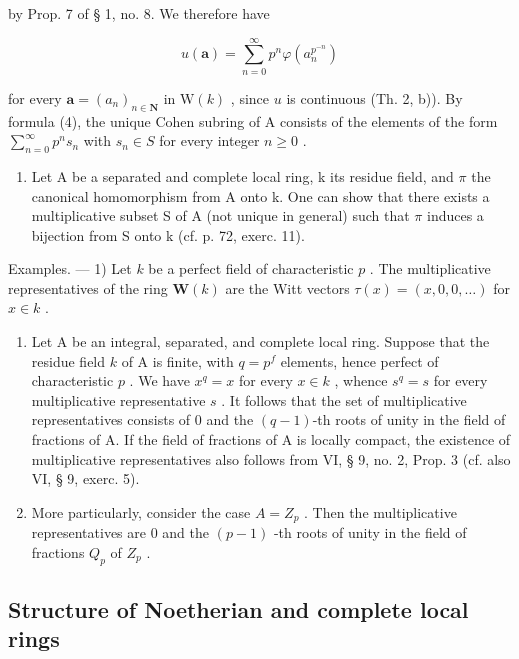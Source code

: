 by Prop. 7 of § 1, no. 8. We therefore have

\[
u (\boldsymbol {a}) = \sum_ {n = 0} ^ {\infty} p ^ {n} \varphi (a _ {n} ^ {p ^ {- n}})\tag{4}
\]

for every \(\boldsymbol{a} = (a_n)_{n \in \mathbf{N}}\) in \(\mathrm{W}(k)\) , since \(u\) is continuous (Th. 2, b)). By formula (4), the unique Cohen subring of A consists of the elements of the form \(\sum_{n=0}^{\infty} p^n s_n\) with \(s_n \in S\) for every integer \(n \geqslant 0\) .

\begin{enumerate}
\def\labelenumi{\arabic{enumi})}
\setcounter{enumi}{1}
\tightlist
\item
  Let A be a separated and complete local ring, k its residue field, and \(\pi\) the canonical homomorphism from A onto k. One can show that there exists a multiplicative subset S of A (not unique in general) such that \(\pi\) induces a bijection from S onto k (cf. p. 72, exerc. 11).
\end{enumerate}

Examples. --- 1) Let \(k\) be a perfect field of characteristic \(p\) . The multiplicative representatives of the ring \(\mathbf{W}(k)\) are the Witt vectors \(\tau(x) = (x, 0, 0, \ldots)\) for \(x \in k\) .

\begin{enumerate}
\def\labelenumi{\arabic{enumi})}
\setcounter{enumi}{1}
\item
  Let A be an integral, separated, and complete local ring. Suppose that the residue field \(k\) of A is finite, with \(q = p^{f}\) elements, hence perfect of characteristic \(p\) . We have \(x^{q} = x\) for every \(x \in k\) , whence \(s^{q} = s\) for every multiplicative representative \(s\) . It follows that the set of multiplicative representatives consists of 0 and the \((q - 1)\)-th roots of unity in the field of fractions of A. If the field of fractions of A is locally compact, the existence of multiplicative representatives also follows from VI, § 9, no. 2, Prop. 3 (cf. also VI, § 9, exerc. 5).
\item
  More particularly, consider the case \(A = Z_{p}\) . Then the multiplicative representatives are 0 and the \((p - 1)\) -th roots of unity in the field of fractions \(Q_{p}\) of \(Z_{p}\) .
\end{enumerate}

\subsection{Structure of Noetherian and complete local rings}

